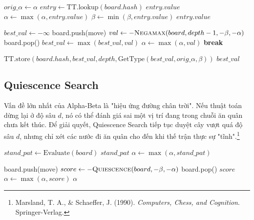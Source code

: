 \begin{algorithm}[H]
\caption{Negamax với Transposition Table}
\begin{algorithmic}[1]
    \State $orig\_ \alpha \gets \alpha$
    \State $entry \gets \text{TT.lookup}(board.hash)$
         \State \Return $entry.value$
         \State $\alpha \gets \max(\alpha, entry.value)$
         \State $\beta \gets \min(\beta, entry.value)$
        \EndIf
        \If{$\alpha \ge \beta$} \State \Return $entry.value$ \EndIf
    \EndIf

        \State \Return {}
    \EndIf

    \State $best\_val \gets -\infty$
        \State board.push(move)
        \State $val \gets -\Call{Negamax}{board, depth-1, -\beta, -\alpha}$
        \State board.pop()
        \State $best\_val \gets \max(best\_val, val)$
        \State $\alpha \gets \max(\alpha, val)$
        \If{$\alpha \ge \beta$} \textbf{break} \EndIf
    \EndFor

    \State $\text{TT.store}(board.hash, best\_val, depth, \text{GetType}(best\_val, orig\_ \alpha, \beta))$
    \State \Return $best\_val$
\EndFunction
\end{algorithmic}
\end{algorithm}

\subsection{Quiescence Search}
Vấn đề lớn nhất của Alpha-Beta là "hiệu ứng đường chân trời". Nếu thuật toán dừng lại ở độ sâu $d$, nó có thể đánh giá sai một vị trí đang trong chuỗi ăn quân chưa kết thúc. Để giải quyết, Quiescence Search tiếp tục duyệt cây vượt quá độ sâu $d$, nhưng chỉ xét các nước đi ăn quân cho đến khi thế trận thực sự "tĩnh".\footnote{Marsland, T. A., \& Schaeffer, J. (1990). \textit{Computers, Chess, and Cognition}. Springer-Verlag.}

\begin{algorithm}[H]
\caption{Quiescence Search}
\begin{algorithmic}[1]
    \State $stand\_pat \gets \text{Evaluate}(board)$
     \State \Return $stand\_pat$ \EndIf
    \State $\alpha \gets \max(\alpha, stand\_pat)$
    
        \State board.push(move)
        \State $score \gets -\Call{Quiescence}{board, -\beta, -\alpha}$
        \State board.pop()
         \State \Return $score$ \EndIf
        \State $\alpha \gets \max(\alpha, score)$
    \EndFor
    \State \Return $\alpha$
\EndFunction
\end{algorithmic}
\end{algorithm}


